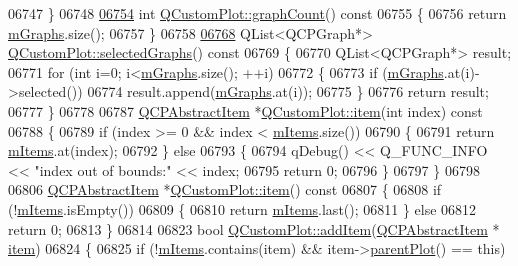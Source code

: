 \begin{DoxyCode}
06747 \}
06748 
\hypertarget{a00115_source_l06754}{}\hyperlink{a00116_a7d9b4d19114b2fde60f0233eeb0aa682}{06754} \textcolor{keywordtype}{int} \hyperlink{a00116_a7d9b4d19114b2fde60f0233eeb0aa682}{QCustomPlot::graphCount}()\textcolor{keyword}{ const}
06755 \textcolor{keyword}{}\{
06756   \textcolor{keywordflow}{return} \hyperlink{a00116_a54ed2081d9366a6c2137bf9d9f7b8371}{mGraphs}.size();
06757 \}
06758 
\hypertarget{a00115_source_l06768}{}\hyperlink{a00116_ad2a0493bdd01e7aa99a4209ae3a5b67b}{06768} QList<QCPGraph*> \hyperlink{a00116_ad2a0493bdd01e7aa99a4209ae3a5b67b}{QCustomPlot::selectedGraphs}()\textcolor{keyword}{ const}
06769 \textcolor{keyword}{}\{
06770   QList<QCPGraph*> result;
06771   \textcolor{keywordflow}{for} (\textcolor{keywordtype}{int} i=0; i<\hyperlink{a00116_a54ed2081d9366a6c2137bf9d9f7b8371}{mGraphs}.size(); ++i)
06772   \{
06773     \textcolor{keywordflow}{if} (\hyperlink{a00116_a54ed2081d9366a6c2137bf9d9f7b8371}{mGraphs}.at(i)->selected())
06774       result.append(\hyperlink{a00116_a54ed2081d9366a6c2137bf9d9f7b8371}{mGraphs}.at(i));
06775   \}
06776   \textcolor{keywordflow}{return} result;
06777 \}
06778 
06787 \hyperlink{a00022}{QCPAbstractItem} *\hyperlink{a00116_aac743a709d025448e36cb65c9117d64b}{QCustomPlot::item}(\textcolor{keywordtype}{int} index)\textcolor{keyword}{ const}
06788 \textcolor{keyword}{}\{
06789   \textcolor{keywordflow}{if} (index >= 0 && index < \hyperlink{a00116_a6fcfff6ea3ccabcac8818943adb79a72}{mItems}.size())
06790   \{
06791     \textcolor{keywordflow}{return} \hyperlink{a00116_a6fcfff6ea3ccabcac8818943adb79a72}{mItems}.at(index);
06792   \} \textcolor{keywordflow}{else}
06793   \{
06794     qDebug() << Q\_FUNC\_INFO << \textcolor{stringliteral}{"index out of bounds:"} << index;
06795     \textcolor{keywordflow}{return} 0;
06796   \}
06797 \}
06798 
06806 \hyperlink{a00022}{QCPAbstractItem} *\hyperlink{a00116_aac743a709d025448e36cb65c9117d64b}{QCustomPlot::item}()\textcolor{keyword}{ const}
06807 \textcolor{keyword}{}\{
06808   \textcolor{keywordflow}{if} (!\hyperlink{a00116_a6fcfff6ea3ccabcac8818943adb79a72}{mItems}.isEmpty())
06809   \{
06810     \textcolor{keywordflow}{return} \hyperlink{a00116_a6fcfff6ea3ccabcac8818943adb79a72}{mItems}.last();
06811   \} \textcolor{keywordflow}{else}
06812     \textcolor{keywordflow}{return} 0;
06813 \}
06814 
06823 \textcolor{keywordtype}{bool} \hyperlink{a00116_a5207a6de1832fa2c156c9e0338e49810}{QCustomPlot::addItem}(\hyperlink{a00022}{QCPAbstractItem} *
      \hyperlink{a00116_aac743a709d025448e36cb65c9117d64b}{item})
06824 \{
06825   \textcolor{keywordflow}{if} (!\hyperlink{a00116_a6fcfff6ea3ccabcac8818943adb79a72}{mItems}.contains(item) && item->\hyperlink{a00044_ab7e0e94461566093d36ffc0f5312b109}{parentPlot}() == \textcolor{keyword}{this})

\end{DoxyCode}
